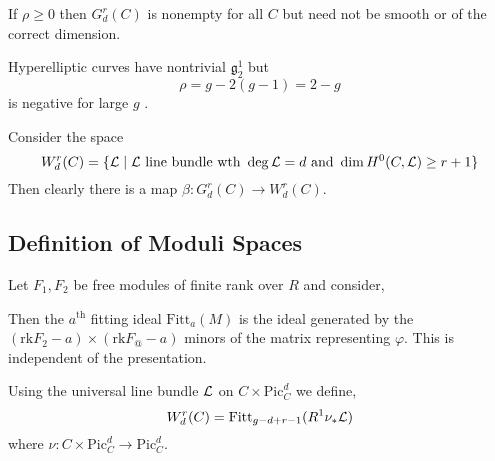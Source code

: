 \documentclass[12pt]{article}
\begin{document}
\begin{rmk}
If $\rho \ge 0$ then $G^r_d(C)$ is nonempty for all $C$ but need not be smooth or of the correct dimension. 
\end{rmk}

\newcommand{\g}{\mathfrak{g}}
\newcommand{\Fitt}{\mathrm{Fitt}}

\begin{example}
Hyperelliptic curves have nontrivial $\g^1_2$ but
\[ \rho = g - 2(g - 1) = 2 - g \]
is negative for large $g$ . 
\end{example}

\begin{defn}
Consider the space
\[ W^r_d(C) = \{ \mathcal{L} \mid \mathcal{L} \text{ line bundle wth } \deg{\mathcal{L}} = d \text{ and } \dim{H^0(C, \mathcal{L})} \ge r + 1 \} \]
Then clearly there is a map $\beta : G^r_d(C) \to W^r_d(C)$.
\end{defn}

\subsection{Definition of Moduli Spaces}

\newcommand{\rk}{\mathrm{rk}}
\renewcommand{\Pic}{\mathrm{Pic}}

\begin{defn}
Let $F_1, F_2$ be free modules of finite rank over $R$ and consider,
\begin{center}
\end{center}
Then the $a^{\text{th}}$ fitting ideal $\Fitt_a(M)$ is the ideal generated by the $(\rk F_2 - a) \times (\rk F_@ - a)$ minors of the matrix representing $\varphi$. This is independent of the presentation.
\end{defn}

\begin{defn}
Using the universal line bundle $\mathcal{L}$ on $C \times \Pic_C^d$ we define,
\[ W^r_d(C) = \Fitt_{g - d + r  -1} (R^1 \nu_* \L) \]
where $\nu : C \times \Pic_C^d \to \Pic_C^d$. 
\end{defn}
\end{document}
